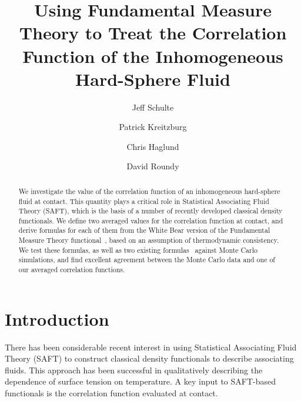 \documentclass[letterpaper,twocolumn,amsmath,amssymb,jcp,10pt,aip]{revtex4-1}
\begin{document}
\title{Using Fundamental Measure Theory to Treat the Correlation
  Function of the Inhomogeneous Hard-Sphere Fluid}

\author{Jeff Schulte}
\author{Patrick Kreitzburg}
\author{Chris Haglund}
\author{David Roundy}


\begin{abstract}
  We investigate the value of the correlation function of an
  inhomogeneous hard-sphere fluid at contact.  This
  quantity plays a critical role in Statistical Associating Fluid
  Theory (SAFT), which is the basis of a number of recently developed classical
  density functionals.  We define two averaged values for the
  correlation function at contact, and derive formulas for each of
  them from the White Bear version of the Fundamental Measure Theory
  functional~\cite{roth2002whitebear}, based on an assumption of
  thermodynamic consistency. We test these formulas, as well as two
  existing formulas~\cite{yu2002fmt-dft-inhomogeneous-associating,
    gross2009density} against Monte Carlo simulations, and find
  excellent agreement between the Monte Carlo data and one of our
  averaged correlation functions.
\end{abstract}

\maketitle

\section{Introduction}

\newcommand\saftlocaldft{felipe2001examination, gloor2002saft,%
  gloor2004accurate, clark2006developing, gloor2007prediction,%
  kahl2008modified, gross2009density}
\newcommand\saftnonlocaldft{yu2002fmt-dft-inhomogeneous-associating,%
  fu2005vapor-liquid-dft,bryk2006density}

There has been considerable recent interest in using Statistical
Associating Fluid Theory (SAFT) to construct classical density
functionals to describe associating
fluids\cite{\saftlocaldft,\saftnonlocaldft}.  This approach has been
successful in qualitatively describing the dependence of surface
tension on temperature.
%
%
A key input to SAFT-based functionals is the correlation function
evaluated at contact.
\end{document}
